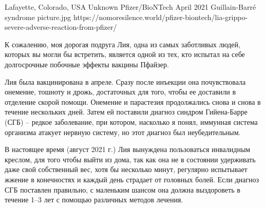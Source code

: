 {Lafayette, Colorado, USA}
{Unknown}
{Pfizer/BioNTech}
{April 2021}
{Guillain-Barré syndrome}
{picture.jpg}
{https://nomoresilence.world/pfizer-biontech/lia-grippo-severe-adverse-reaction-from-pfizer/}
{
  
К сожалению, моя дорогая подруга Лия, одна из самых заботливых людей, которых вы
могли бы встретить, является одной из тех, кто испытал на себе долгосрочные
побочные эффекты вакцины Пфайзер.

Лия была вакцинирована в апреле. Сразу после инъекции она почувствовала
онемение, тошноту и дрожь, достаточных для того, чтобы ее доставили в отделение
скорой помощи. Онемение и парастезия продолжались снова и снова в течение
нескольких дней. Затем ей поставили диагноз синдром Гийена-Барре (СГБ) – редкое
заболевание, при котором, насколько я понял, иммунная система организма атакует
нервную систему, но этот диагноз был неубедительным.

В настоящее время (август 2021 г.) Лия вынуждена пользоваться инвалидным
креслом, для того чтобы выйти из дома, так как она не в состоянии удерживать
даже свой собственный вес, хотя бы несколько минут, регулярно испытывает жжение
в конечностях и каждый день страдает от головных болей. Если диагноз СГБ
поставлен правильно, с маленьким шансом она должна выздороветь в течение 1–3 лет
с помощью различных методов лечения.

}

